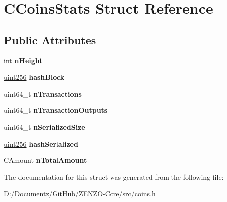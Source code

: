 \hypertarget{struct_c_coins_stats}{}\section{C\+Coins\+Stats Struct Reference}
\label{struct_c_coins_stats}
\subsection*{Public Attributes}
\begin{DoxyCompactItemize}
\item 
\mbox{\label{struct_c_coins_stats_a5972700c4733ce02e12530d758e95d8c}} 
int {\bfseries n\+Height}
\item 
\mbox{\label{struct_c_coins_stats_a75b32757ea85b8df6453490e1acc4607}} 
\mbox{\hyperlink{classuint256}{uint256}} {\bfseries hash\+Block}
\item 
\mbox{\label{struct_c_coins_stats_a0b04da159443c350e9b9e8a39c6a82db}} 
uint64\+\_\+t {\bfseries n\+Transactions}
\item 
\mbox{\label{struct_c_coins_stats_a02612be210ba7c628d04ddedd83b9ff0}} 
uint64\+\_\+t {\bfseries n\+Transaction\+Outputs}
\item 
\mbox{\label{struct_c_coins_stats_ac4302ffc2f8be6e62dbc5655f77e4202}} 
uint64\+\_\+t {\bfseries n\+Serialized\+Size}
\item 
\mbox{\label{struct_c_coins_stats_a0ce8e745d7a62e4ae41f943333c81d7c}} 
\mbox{\hyperlink{classuint256}{uint256}} {\bfseries hash\+Serialized}
\item 
\mbox{\label{struct_c_coins_stats_a97c76344c650e55377d5f9246a906cc4}} 
C\+Amount {\bfseries n\+Total\+Amount}
\end{DoxyCompactItemize}


The documentation for this struct was generated from the following file\+:\begin{DoxyCompactItemize}
\item 
D\+:/\+Documentz/\+Git\+Hub/\+Z\+E\+N\+Z\+O-\/\+Core/src/coins.\+h\end{DoxyCompactItemize}
